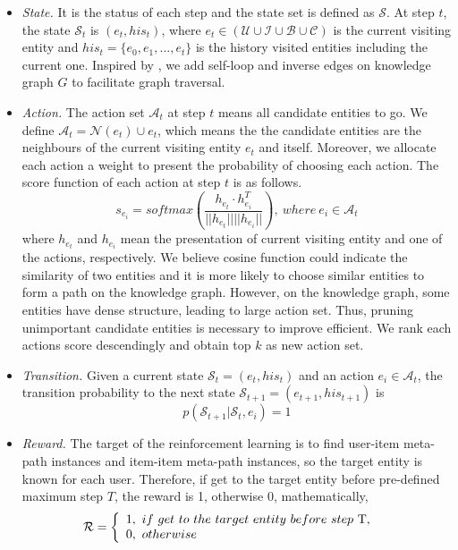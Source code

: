 \begin{itemize}
	\item \textit{State.}
	It is the status of each step and the state set is defined as $\mathcal{S}$. At step $t$, the state $\mathcal{S}_t$ is $(e_t, his_t)$, where $e_t \in (\mathcal{U} \cup \mathcal{I} \cup \mathcal{B} \cup \mathcal{C})$ is the current visiting entity and $his_t = \{e_0, e_1, ..., e_t\}$ is the history visited entities including the current one. Inspired by \cite{xian2019reinforcement, saebi2020heterogeneous, wenhan_emnlp2017, minerva}, we add self-loop and inverse edges on knowledge graph $G$ to facilitate graph traversal. 
	\item \textit{Action.} 
	The action set $\mathcal{A}_t$ at step $t$ means all candidate entities to go. We define $\mathcal{A}_t = \mathcal{N}(e_t) \cup e_t$, which means the the candidate entities are the neighbours of the current visiting entity $e_t$ and itself. Moreover, we allocate each action a weight to present the probability of choosing each action. The score function of each action at step $t$ is as follows.
	\begin{equation}
		s_{e_i} = softmax(\frac{h_{e_t} \cdot h_{e_i}^T}{||h_{e_t}|| ||h_{e_i}||}),\  where\ e_i \in \mathcal{A}_t
	\end{equation}
	where $h_{e_t}$ and $h_{e_i}$ mean the presentation of current visiting entity and one of the actions, respectively. We believe cosine function could indicate the similarity of two entities and it is more likely to choose similar entities to form a path on the knowledge graph. However, on the knowledge graph, some entities have dense structure, leading to large action set. Thus, pruning unimportant candidate entities is necessary to improve efficient. We rank each actions score descendingly and obtain top $k$ as new action set.
	
	\item \textit{Transition.}
	Given a current state $\mathcal{S}_t=(e_t, his_t)$ and an action $e_i \in \mathcal{A}_t$, the transition probability to the next state $\mathcal{S}_{t+1}=(e_{t+1}, his_{t+1})$ is 
	\begin{equation}
		p(\mathcal{S}_{t+1}|\mathcal{S}_t,e_i)=1
	\end{equation}
	\item \textit{Reward.}
	The target of the reinforcement learning is to find user-item meta-path instances and item-item meta-path instances, so the target entity is known for each user. Therefore, if get to the target entity before pre-defined maximum step $T$, the reward is 1, otherwise 0, mathematically,
	\begin{equation}
		\mathcal{R}=
		\left\{
		\begin{array}{lr}
			1, \ if\ get\ to\ the\ target\ entity\ before\ step\ $T$,&  \\
			0, \ otherwise &  
		\end{array}
		\right.
	\end{equation}
	

\end{itemize}
